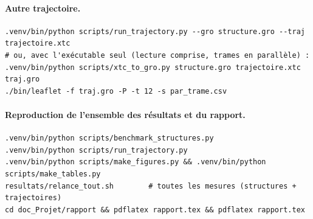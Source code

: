 \documentclass[11pt,a4paper]{article}
\begin{document}
\paragraph{Autre trajectoire.}
\begin{lstlisting}
.venv/bin/python scripts/run_trajectory.py --gro structure.gro --traj trajectoire.xtc
# ou, avec l'exécutable seul (lecture comprise, trames en parallèle) :
.venv/bin/python scripts/xtc_to_gro.py structure.gro trajectoire.xtc traj.gro
./bin/leaflet -f traj.gro -P -t 12 -s par_trame.csv
\end{lstlisting}

\paragraph{Reproduction de l'ensemble des résultats et du rapport.}
\begin{lstlisting}
.venv/bin/python scripts/benchmark_structures.py
.venv/bin/python scripts/run_trajectory.py
.venv/bin/python scripts/make_figures.py && .venv/bin/python scripts/make_tables.py
resultats/relance_tout.sh        # toutes les mesures (structures + trajectoires)
cd doc_Projet/rapport && pdflatex rapport.tex && pdflatex rapport.tex
\end{lstlisting}
\end{document}
